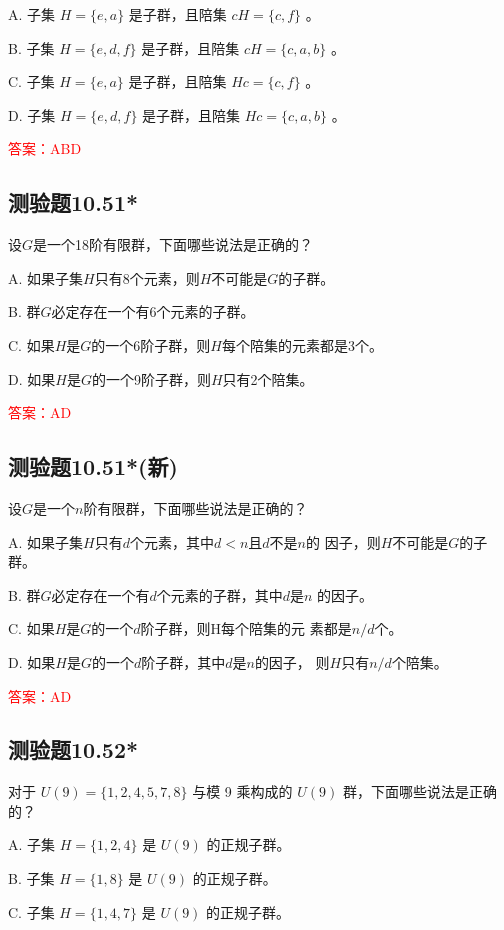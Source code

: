 \documentclass[UTF8, heading=true]{ctexart}
\begin{document}
A. 子集 $H=\{e, a\}$ 是子群，且陪集 $c H=\{c, f\}$ 。

B. 子集 $H=\{e, d, f\}$ 是子群，且陪集 $c H=\{c, a, b\}$ 。

C. 子集 $H=\{e, a\}$ 是子群，且陪集 $H c=\{c, f\}$ 。

D. 子集 $H=\{e, d, f\}$ 是子群，且陪集 $H c=\{c, a, b\}$ 。

\textcolor{red}{答案：ABD}

\subsection{测验题10.51*}

设$G$是一个18阶有限群，下面哪些说法是正确的？

A. 如果子集$H$只有8个元素，则$H$不可能是$G$的子群。

B. 群$G$必定存在一个有6个元素的子群。

C. 如果$H$是$G$的一个6阶子群，则$H$每个陪集的元素都是3个。

D. 如果$H$是$G$的一个9阶子群，则$H$只有2个陪集。

\textcolor{red}{答案：AD}

\subsection{测验题10.51*(新)}

设$G$是一个$n$阶有限群，下面哪些说法是正确的？

A. 如果子集$H$只有$d$个元素，其中$d<n$且$d$不是$n$的
因子，则$H$不可能是$G$的子群。

B. 群$G$必定存在一个有$d$个元素的子群，其中$d$是$n$
的因子。

C. 如果$H$是$G$的一个$d$阶子群，则H每个陪集的元
素都是$n/d$个。

D. 如果$H$是$G$的一个$d$阶子群，其中$d$是$n$的因子，
则$H$只有$n/d$个陪集。

\textcolor{red}{答案：AD}

\subsection{测验题10.52*}

对于 $U(9)=\{1,2,4,5,7,8\}$ 与模 9 乘构成的 $U(9)$ 群，下面哪些说法是正确的？

A. 子集 $H=\{1,2,4\}$ 是 $U(9)$ 的正规子群。

B. 子集 $H=\{1,8\}$ 是 $U(9)$ 的正规子群。

C. 子集 ${H}=\{1,4,7\}$ 是 ${U}(9)$ 的正规子群。
\end{document}
